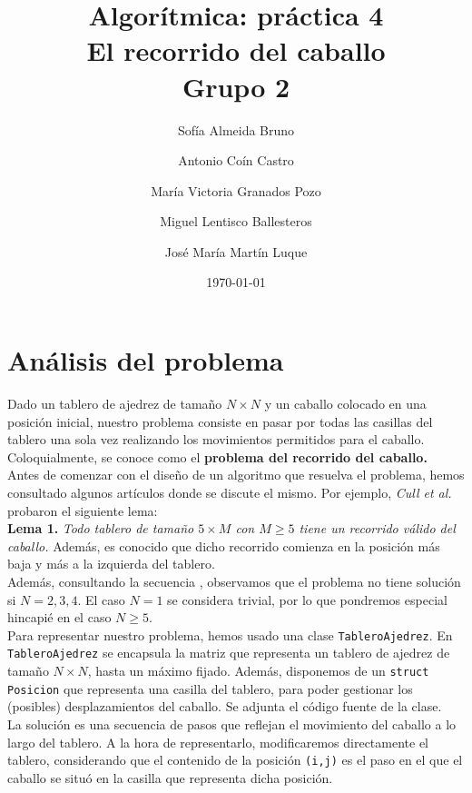 \documentclass[11pt]{article}
\title{Algorítmica: práctica 4 \\ \large El recorrido del caballo\\ \vspace{0.2em}Grupo 2}
\author{Sofía Almeida Bruno \and Antonio Coín Castro \and María Victoria Granados Pozo \and Miguel Lentisco Ballesteros \and José María Martín Luque}
\date{\today}
\begin{document}
\maketitle

\newpage

\section*{Análisis del problema}

Dado un tablero de ajedrez de tamaño $N\times N$ y un caballo colocado en una posición inicial, nuestro problema consiste en pasar por todas las casillas del tablero una sola vez realizando los movimientos permitidos para el caballo. Coloquialmente, se conoce como el \textbf{problema del recorrido del caballo.}\\

Antes de comenzar con el diseño de un algoritmo que resuelva el problema, hemos consultado algunos artículos donde se discute el mismo. Por ejemplo, \textit{Cull et al.} \cite{cull} probaron el siguiente lema:\\

\textbf{Lema 1.} \textit{Todo tablero de tamaño $5\times M$ con $M\ge5$ tiene un recorrido válido del caballo.} Además, es conocido que dicho recorrido comienza en la posición más baja y más a la izquierda del tablero.\\

Además, consultando la secuencia \cite{sequence}, observamos que el problema no tiene solución si $N=2,3,4$. El caso $N=1$ se considera trivial, por lo que pondremos especial hincapié en el caso $N\ge5$.\\

Para representar nuestro problema, hemos usado una clase \verb|TableroAjedrez|. En \verb|TableroAjedrez| se encapsula la matriz que representa un tablero de ajedrez de tamaño $N\times N$, hasta un máximo fijado. Además, disponemos de un \verb|struct Posicion| que representa una casilla del tablero, para poder gestionar los (posibles) desplazamientos del caballo. Se adjunta el código fuente de la clase.\\

La solución es una secuencia de pasos que reflejan el movimiento del caballo a lo largo del tablero. A la hora de representarlo, modificaremos directamente el tablero, considerando que el contenido de la posición \verb|(i,j)| es el paso en el que el caballo se situó en la casilla que representa dicha posición.
\end{document}

